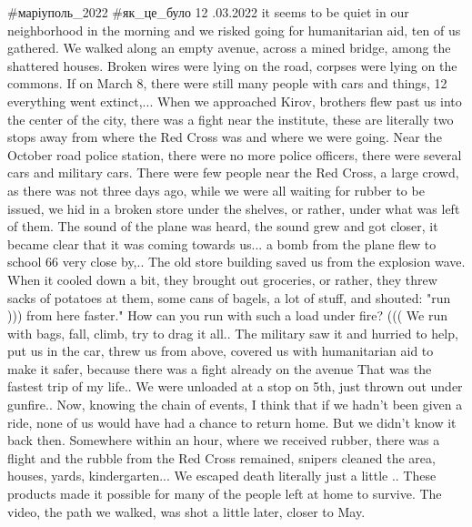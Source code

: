  
 
 
 
 

#маріуполь_2022 #як_це_було
12 .03.2022 
it seems to be quiet in our neighborhood in the morning and we risked going for humanitarian aid, ten of us gathered.
We walked along an empty avenue, across a mined bridge, among the shattered houses. Broken wires were lying on the road, corpses were lying on the commons. If on March 8, there were still many people with cars and things, 12 everything went extinct,... When we approached Kirov, brothers flew past us into the center of the city, there was a fight near the institute, these are literally two stops away from where the Red Cross was and where we were going.
Near the October road police station, there were no more police officers, there were several cars and military cars.
There were few people near the Red Cross, a large crowd, as there was not three days ago, while we were all waiting for rubber to be issued, we hid in a broken store under the shelves, or rather, under what was left of them.
The sound of the plane was heard, the sound grew and got closer, it became clear that it was coming towards us... a bomb from the plane flew to school 66 very close by,.. The old store building saved us from the explosion wave.
When it cooled down a bit, they brought out groceries, or rather, they threw sacks of potatoes at them, some cans of bagels, a lot of stuff, and shouted: "run ))) from here faster." How can you run with such a load under fire? (((
We run with bags, fall, climb, try to drag it all..
The military saw it and hurried to help, put us in the car, threw us from above, covered us with humanitarian aid to make it safer, because there was a fight already on the avenue
That was the fastest trip of my life..
We were unloaded at a stop on 5th, just thrown out under gunfire..
Now, knowing the chain of events, I think that if we hadn't been given a ride, none of us would have had a chance to return home.
But we didn't know it back then.
Somewhere within an hour, where we received rubber, there was a flight and the rubble from the Red Cross remained, snipers cleaned the area, houses, yards, kindergarten...
We escaped death literally just a little ..
These products made it possible for many of the people left at home to survive.
The video, the path we walked, was shot a little later, closer to May.
